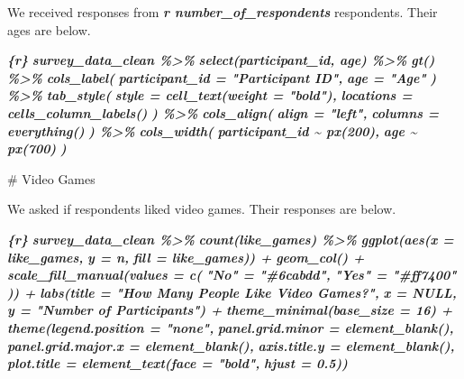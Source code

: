 \documentclass[
]{book}
\newenvironment{Shaded}{\begin{snugshade}}{\end{snugshade}}
\newcommand{\FunctionTok}[1]{\textcolor[rgb]{0.00,0.00,0.00}{#1}}
\newcommand{\InformationTok}[1]{\textcolor[rgb]{0.56,0.35,0.01}{\textbf{\textit{#1}}}}
\newcommand{\NormalTok}[1]{#1}
\begin{document}
\begin{Shaded}
\begin{Highlighting}[]
\NormalTok{We received responses from }\InformationTok{\textasciigrave{}r number\_of\_respondents\textasciigrave{}}\NormalTok{ respondents. Their ages are below.}

\InformationTok{\textasciigrave{}\textasciigrave{}\textasciigrave{}\{r\}}
\InformationTok{survey\_data\_clean \%\textgreater{}\% }
\InformationTok{  select(participant\_id, age) \%\textgreater{}\% }
\InformationTok{  gt() \%\textgreater{}\% }
\InformationTok{  cols\_label(}
\InformationTok{    participant\_id = "Participant ID",}
\InformationTok{    age = "Age"}
\InformationTok{  ) \%\textgreater{}\% }
\InformationTok{  tab\_style(}
\InformationTok{    style = cell\_text(weight = "bold"),}
\InformationTok{    locations = cells\_column\_labels()}
\InformationTok{  ) \%\textgreater{}\% }
\InformationTok{  cols\_align(}
\InformationTok{    align = "left",}
\InformationTok{    columns = everything()}
\InformationTok{  ) \%\textgreater{}\% }
\InformationTok{  cols\_width(}
\InformationTok{    participant\_id \textasciitilde{} px(200),}
\InformationTok{    age \textasciitilde{} px(700)}
\InformationTok{  ) }
\InformationTok{\textasciigrave{}\textasciigrave{}\textasciigrave{}}

\FunctionTok{\# Video Games}

\NormalTok{We asked if respondents liked video games. Their responses are below.}

\InformationTok{\textasciigrave{}\textasciigrave{}\textasciigrave{}\{r\}}
\InformationTok{survey\_data\_clean \%\textgreater{}\%}
\InformationTok{  count(like\_games) \%\textgreater{}\% }
\InformationTok{  ggplot(aes(x = like\_games,}
\InformationTok{             y = n,}
\InformationTok{             fill = like\_games)) +}
\InformationTok{  geom\_col() +}
\InformationTok{  scale\_fill\_manual(values = c(}
\InformationTok{    "No" = "\#6cabdd",}
\InformationTok{    "Yes" = "\#ff7400"}
\InformationTok{  )) +}
\InformationTok{  labs(title = "How Many People Like Video Games?", }
\InformationTok{       x = NULL,}
\InformationTok{       y = "Number of Participants") +}
\InformationTok{  theme\_minimal(base\_size = 16) +}
\InformationTok{  theme(legend.position = "none",}
\InformationTok{        panel.grid.minor = element\_blank(),}
\InformationTok{        panel.grid.major.x = element\_blank(),}
\InformationTok{        axis.title.y = element\_blank(),}
\InformationTok{        plot.title = element\_text(face = "bold",}
\InformationTok{                                  hjust = 0.5))}
\InformationTok{\textasciigrave{}\textasciigrave{}\textasciigrave{}}
\end{Highlighting}
\end{Shaded}
\end{document}
